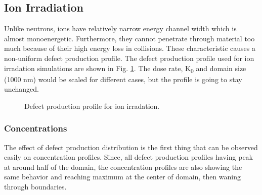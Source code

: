 \documentclass[a4paper]{article}
\begin{document}
  \subsection{Ion Irradiation} \hspace{10pt}
  Unlike neutrons, ions have relatively narrow energy channel width which is almost monoenergetic. Furthermore, they cannot penetrate through material too much because of their high energy loss in collisions. These characteristic causes a non-uniform defect production profile. The defect production profile used for ion irradation simulations are shown in Fig. \ref{figure:defect_production}. The dose rate, K\textsubscript{0} and domain size (1000 nm) would be scaled for different cases, but the profile is going to stay unchanged.
    \begin{figure}[h!]  %
      \centering
      \qquad
      \caption{Defect production profile for ion irradation.}
      \label{figure:defect_production}
    \end{figure}
    \newpage
    \subsubsection{Concentrations} \hspace{10pt}
    The effect of defect production distribution is the first thing that can be observed easily on concentration profiles. Since, all defect production profiles having peak at around half of the domain, the concentration profiles are also showing the same behavior and reaching maximum at the center of domain, then waning through boundaries.
\end{document}
